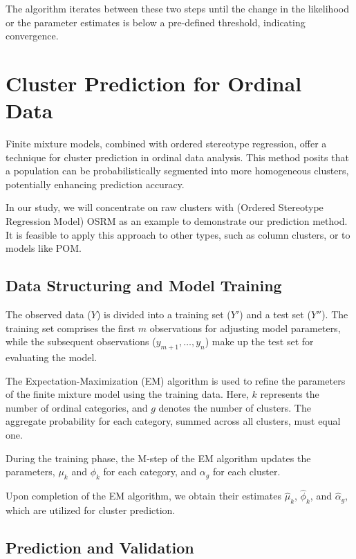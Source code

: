 \documentclass{article}
\begin{document}
The algorithm iterates between these two steps until the change in the likelihood or the parameter estimates is below a pre-defined threshold, indicating convergence.




\section{Cluster Prediction for Ordinal Data}

Finite mixture models, combined with ordered stereotype regression, offer a technique for cluster prediction in ordinal data analysis. This method posits that a population can be probabilistically segmented into more homogeneous clusters, potentially enhancing prediction accuracy.

In our study, we will concentrate on raw clusters with (Ordered Stereotype Regression Model) OSRM as an example to demonstrate our prediction method. It is feasible to apply this approach to other types, such as column clusters, or to models like POM.

\subsection*{Data Structuring and Model Training}

The observed data ($Y$) is divided into a training set ($Y'$) and a test set ($Y''$). The training set comprises the first $m$ observations for adjusting model parameters, while the subsequent observations ($y_{m+1}, \dots, y_n$) make up the test set for evaluating the model.

The Expectation-Maximization (EM) algorithm is used to refine the parameters of the finite mixture model using the training data. Here, $k$ represents the number of ordinal categories, and $g$ denotes the number of clusters. The aggregate probability for each category, summed across all clusters, must equal one.

During the training phase, the M-step of the EM algorithm updates the parameters, $\mu_k$ and $\phi_k$ for each category, and $\alpha_g$ for each cluster.

Upon completion of the EM algorithm, we obtain their estimates $\hat{\mu}_k$, $\hat{\phi}_k$, and $\hat{\alpha}_g$, which are utilized for cluster prediction.

\subsection*{Prediction and Validation}
\end{document}
